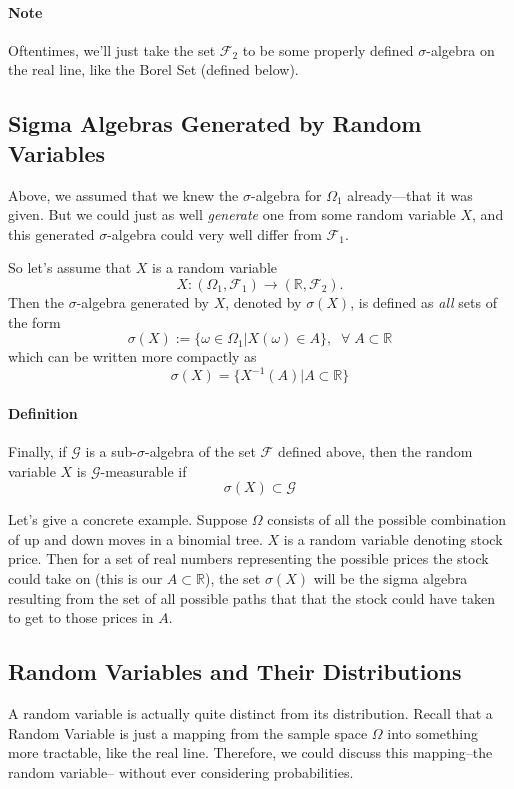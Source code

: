 \documentclass[12pt]{article}
\theoremstyle{plain}
\theoremstyle{definition}
\theoremstyle{remark}
\begin{document}
\paragraph{Note} Oftentimes, we'll just take the set
$\mathcal{F}_2$ to be some properly
defined $\sigma$-algebra on the real line, like the Borel Set
(defined below).

\subsection{Sigma Algebras Generated by Random Variables}

Above, we assumed that we knew the $\sigma$-algebra for
$\Omega_1$ already---that it was given. But we
could just as well \emph{generate} one from some random variable $X$,
and this generated $\sigma$-algebra could very well differ from
$\mathcal{F}_1$.

So let's assume that $X$ is a random variable
   \[X: (\Omega_1,\mathcal{F}_1) \rightarrow
      (\mathbb{R},\mathcal{F}_2).\]
Then the $\sigma$-algebra generated by $X$, denoted by $\sigma(X)$, is
defined as \emph{all} sets of the form
   \[ \sigma(X) := \{ \omega \in \Omega_1 | X(\omega) \in A \}, \;\;
      \forall \; A \subset \mathbb{R} \]
which can be written more compactly as
   \[\sigma(X)  = \{ X^{-1}(A) | A\subset \mathbb{R}  \} \]

\paragraph{Definition} Finally, if $\mathcal{G}$ is a
sub-$\sigma$-algebra of the set $\mathcal{F}$ defined above, then the
random variable $X$ is $\mathcal{G}$-measurable if
   \[ \sigma(X) \subset \mathcal{G} \]

Let's give a concrete example.  Suppose $\Omega$ consists of all the
possible combination of up and down moves in a binomial tree.  $X$ is
a random variable denoting stock price.  Then for a set of real numbers
representing the possible prices the stock could take on (this is
our $A \subset \mathbb{R}$), the set $\sigma(X)$ will be the sigma
algebra resulting from the set of all possible paths that that the
stock could have taken to get to those prices in $A$.

\subsection{Random Variables and Their Distributions}

A random variable is actually quite distinct from its distribution.  Recall that a Random Variable is just a mapping from the
sample space $\Omega$ into something more tractable, like the real line.  Therefore, we could discuss this mapping--the random variable--
without ever considering probabilities.
\end{document}
